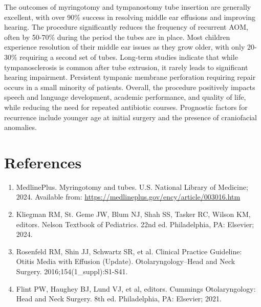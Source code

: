 The outcomes of myringotomy and tympanostomy tube insertion are generally excellent, with over 90\% success in resolving middle ear effusions and improving hearing. The procedure significantly reduces the frequency of recurrent AOM, often by 50-70\% during the period the tubes are in place. Most children experience resolution of their middle ear issues as they grow older, with only 20-30\% requiring a second set of tubes. Long-term studies indicate that while tympanosclerosis is common after tube extrusion, it rarely leads to significant hearing impairment. Persistent tympanic membrane perforation requiring repair occurs in a small minority of patients. Overall, the procedure positively impacts speech and language development, academic performance, and quality of life, while reducing the need for repeated antibiotic courses. Prognostic factors for recurrence include younger age at initial surgery and the presence of craniofacial anomalies.

\section*{References}
\begin{enumerate}
  \item MedlinePlus. Myringotomy and tubes. U.S. National Library of Medicine; 2024. Available from: \url{https://medlineplus.gov/ency/article/003016.htm}
  
  \item Kliegman RM, St. Geme JW, Blum NJ, Shah SS, Tasker RC, Wilson KM, editors. Nelson Textbook of Pediatrics. 22nd ed. Philadelphia, PA: Elsevier; 2024.
  
  \item Rosenfeld RM, Shin JJ, Schwartz SR, et al. Clinical Practice Guideline: Otitis Media with Effusion (Update). Otolaryngology--Head and Neck Surgery. 2016;154(1\_suppl):S1-S41.
  
  \item Flint PW, Haughey BJ, Lund VJ, et al, editors. Cummings Otolaryngology: Head and Neck Surgery. 8th ed. Philadelphia, PA: Elsevier; 2021.
\end{enumerate}

\clearpage
